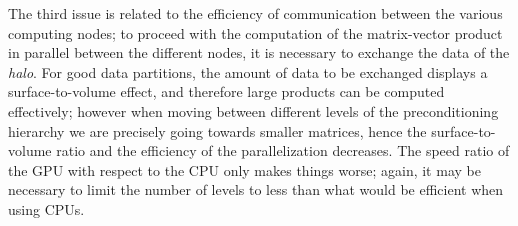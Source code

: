 The third issue is related to the efficiency of communication between
the various computing nodes; to proceed with the computation of the
matrix-vector product in parallel between the different nodes, it is
necessary to exchange the data of the \emph{halo}. For good data
partitions, the amount of data to be exchanged displays a
surface-to-volume effect, and therefore large products can be computed
effectively; however when moving between different levels of the
preconditioning hierarchy we are precisely going towards smaller
matrices, hence the surface-to-volume ratio and the efficiency of the
parallelization decreases. The speed ratio of the GPU with respect to
the CPU only makes things worse; again, it may be necessary to limit
the number of levels to less than what would be efficient when using
CPUs. 